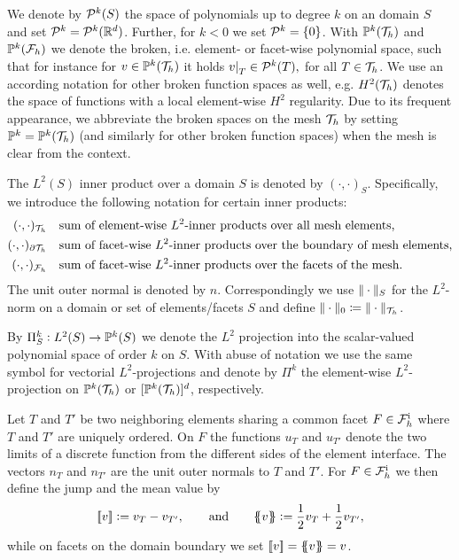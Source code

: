 \documentclass[pdflatex,sn-mathphys,Numbered]{sn-jnl}%
\theoremstyle{remark}%
\theoremstyle{definition}%
\begin{document}
We denote by $\mathcal{P}^k(S)$ the space of polynomials up to degree $k$ on
an domain $S$ and set $\mathcal{P}^k = \mathcal{P}^k(\mathbb{R}^d)$. 
Further, for $k < 0$ we set $\mathcal{P}^k = \{0\}$.
With $\mathbb{P}^k({\mathcal{T}_h})$ and
$\mathbb{P}^k({\mathcal{F}_h})$ we denote the broken, i.e. element- or facet-wise
polynomial space, such that for instance for $v\in\mathbb{P}^k({\mathcal{T}_h})$ it holds
$\restr{v}{T}\in\cP^k(T),$ for all $T\in{\mathcal{T}_h}$. We use an according
notation for other broken function spaces as well, e.g. $H^2({\mathcal{T}_h})$
denotes the space of functions with a local element-wise $H^2$
regularity. Due to its frequent appearance, we abbreviate the broken
spaces on the mesh ${\mathcal{T}_h}$ by setting $\mathbb{P}^k = \mathbb{P}^k({\mathcal{T}_h})$ (and similarly for
other broken function spaces) when the mesh is clear from the context.

The $L^2(S)$ inner product over a domain $S$ is denoted by
$(\cdot,\cdot)_S$. Specifically, we introduce the following notation for certain inner products:
\begin{align*}
(\cdot,\cdot)_{\mathcal{T}_h} & \quad\text{sum of element-wise $L^2$-inner products over all mesh elements,}  \\
(\cdot,\cdot)_{\partial {\mathcal{T}_h}} & \quad\text{sum of facet-wise $L^2$-inner products over the boundary of mesh elements,}   \\
(\cdot,\cdot)_{\mathcal{F}_h} &\quad\text{sum of facet-wise $L^2$-inner products over the facets of the mesh.}
\end{align*}
The unit outer normal is denoted by $n$. Correspondingly we use
$\Vert \cdot \Vert_S$ for the $L^2$-norm on a domain or set of
elements/facets $S$ and define $\Vert \cdot \Vert_0 \coloneqq
\Vert \cdot \Vert_{\mathcal{T}_h}$.  

By $\Pi^k_S: L^2(S) \to \mathbb{P}^k(S)$ we denote the $L^2$ projection into
the scalar-valued polynomial space of order $k$ on $S$. With abuse of
notation we use the same symbol for vectorial $L^2$-projections and
denote by $\Pi^k$ the element-wise $L^2$-projection on $\mathbb{P}^k({\mathcal{T}_h})$ or
$[\mathbb{P}^k({\mathcal{T}_h})]^d$, respectively.

Let $T$ and $T'$ be two neighboring elements sharing a common facet $F
\in {\mathcal{F}_h^{\text{i}}}$ where $T$ and $T'$ are uniquely ordered. On $F$ the
functions $u_{T}$ and $u_{T'}$ denote the two limits of a discrete
function from the different sides of the element interface. The
vectors $n_T$ and $n_{T'}$ are the unit outer normals to $T$ and $T'$.
For $F \in {\mathcal{F}_h^{\text{i}}}$ we then define the jump and the mean value by
\begin{equation*}
    [\![v]\!] := v_{T} - v_{T'}, \qquad \text{and} \qquad
    \{\!\!\{ v\}\!\!\} := \frac12 v_{T} + \frac12 v_{T'},
\end{equation*}
while on facets on the domain boundary we set $[\![v]\!] = \{\!\!\{ v\}\!\!\} =
v$.
\end{document}

